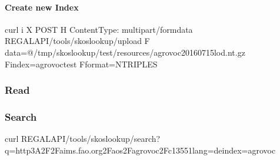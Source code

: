 \documentclass[letterpaper,10pt,english]{sphinxmanual}
\begin{document}
\paragraph{Create new Index}
\label{\detokenize{api-skos:create-new-index}}\label{\detokenize{api-skos:id1}}
\begin{sphinxVerbatim}[commandchars=\\\{\}]
curl \PYGZhy{}i \PYGZhy{}X POST \PYGZhy{}H \PYGZdq{}Content\PYGZhy{}Type: multipart/form\PYGZhy{}data\PYGZdq{} \PYGZdl{}REGAL\PYGZus{}API/tools/skos\PYGZhy{}lookup/upload \PYGZhy{}F \PYGZdq{}data=@/tmp/skos\PYGZhy{}lookup/test/resources/agrovoc\PYGZus{}2016\PYGZhy{}07\PYGZhy{}15\PYGZus{}lod.nt.gz\PYGZdq{} \PYGZhy{}F\PYGZdq{}index=agrovoc\PYGZus{}test\PYGZdq{} \PYGZhy{}F\PYGZdq{}format=NTRIPLES\PYGZdq{}
\end{sphinxVerbatim}


\subsubsection{Read}
\label{\detokenize{api-skos:read}}\label{\detokenize{api-skos:read-4}}
\begin{sphinxVerbatim}[commandchars=\\\{\}]
  
\end{sphinxVerbatim}


\subsubsection{Search}
\label{\detokenize{api-skos:search}}\label{\detokenize{api-skos:search-3}}
\begin{sphinxVerbatim}[commandchars=\\\{\}]
curl \PYGZdl{}REGAL\PYGZus{}API/tools/skos\PYGZhy{}lookup/search?q=http\PYGZpc{}3A\PYGZpc{}2F\PYGZpc{}2Faims.fao.org\PYGZpc{}2Faos\PYGZpc{}2Fagrovoc\PYGZpc{}2Fc\PYGZus{}13551\PYGZam{}lang=de\PYGZam{}index=agrovoc
\end{sphinxVerbatim}
\end{document}
